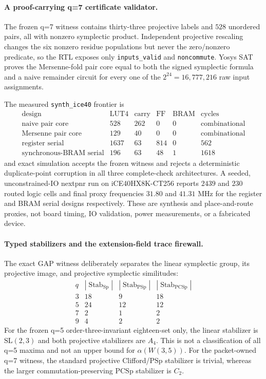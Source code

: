 \paragraph{A proof-carrying q=7 certificate validator.}
The frozen q=7 witness contains thirty-three projective labels and $528$
unordered pairs, all with nonzero symplectic product.  Independent projective
rescaling changes the six nonzero residue populations but never the
zero/nonzero predicate, so the RTL exposes only \texttt{inputs\_valid} and
\texttt{noncommute}.  Yosys SAT proves the Mersenne-fold pair core equal to
both the signed symplectic formula and a naive remainder circuit for every one
of the $2^{24}=16{,}777{,}216$ raw input assignments.

The measured \texttt{synth\_ice40} frontier is
\[
\begin{array}{c|r|r|r|r|r}
\text{design}&\text{LUT4}&\text{carry}&\text{FF}&\text{BRAM}&\text{cycles}\\ \hline
\text{naive pair core}&528&262&0&0&\text{combinational}\\
\text{Mersenne pair core}&129&40&0&0&\text{combinational}\\
\text{register serial}&1637&63&814&0&562\\
\text{synchronous-BRAM serial}&196&63&48&1&1618
\end{array}
\]
and exact simulation accepts the frozen witness and rejects a deterministic
duplicate-point corruption in all three complete-check architectures.  A
seeded, unconstrained-IO nextpnr run on iCE40HX8K-CT256 reports $2439$ and
$230$ routed logic cells and final proxy frequencies $31.80$ and $41.31$ MHz
for the register and BRAM serial designs respectively.  These are synthesis
and place-and-route proxies, not board timing, IO validation, power
measurements, or a fabricated device.

\paragraph{Typed stabilizers and the extension-field trace firewall.}
The exact GAP witness deliberately separates the linear symplectic group, its
projective image, and projective symplectic similitudes:
\[
\begin{array}{c|r|r|r}
q&|\operatorname{Stab}_{\mathrm{Sp}}|&
|\operatorname{Stab}_{\mathrm{PSp}}|&
|\operatorname{Stab}_{\mathrm{PCSp}}|\\ \hline
3&18&9&18\\
5&24&12&12\\
7&2&1&2\\
9&4&2&2
\end{array}
\]
For the frozen q=5 order-three-invariant eighteen-set only, the linear
stabilizer is $\mathrm{SL}(2,3)$ and both projective stabilizers are $A_4$.
This is not a classification of all q=5 maxima and not an upper bound for
$\alpha(W(3,5))$.  For the packet-owned q=7 witness, the standard projective
Clifford/$\mathrm{PSp}$ stabilizer is trivial, whereas the larger
commutation-preserving $\mathrm{PCSp}$ stabilizer is $C_2$.

